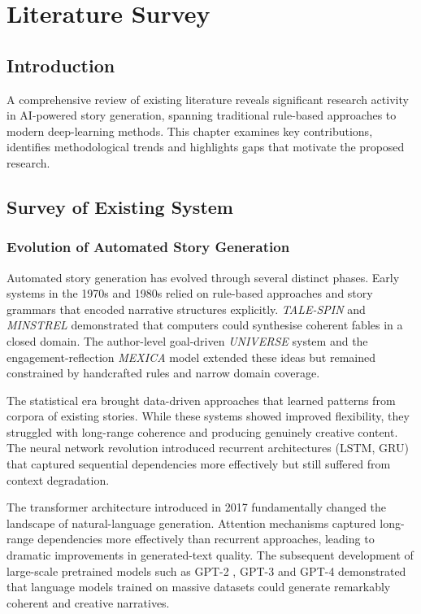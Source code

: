 \chapter{Literature Survey}
\label{ch:litreview}

\section{Introduction}
A comprehensive review of existing literature reveals significant
research activity in AI-powered story generation, spanning traditional
rule-based approaches to modern deep-learning methods. This chapter
examines key contributions, identifies methodological trends and
highlights gaps that motivate the proposed research.

\section{Survey of Existing System}

\subsection{Evolution of Automated Story Generation}
Automated story generation has evolved through several distinct
phases. Early systems in the 1970s and 1980s relied on rule-based
approaches and story grammars that encoded narrative structures
explicitly. \emph{TALE-SPIN} \cite{meehan1977talespin} and
\emph{MINSTREL} demonstrated that computers could synthesise coherent
fables in a closed domain. The author-level goal-driven \emph{UNIVERSE}
system \cite{lebowitz1985universe} and the engagement-reflection
\emph{MEXICA} model \cite{perezperez2001mexica} extended these ideas
but remained constrained by handcrafted rules and narrow domain
coverage.

The statistical era brought data-driven approaches that learned
patterns from corpora of existing stories. While these systems showed
improved flexibility, they struggled with long-range coherence and
producing genuinely creative content. The neural network revolution
introduced recurrent architectures (LSTM, GRU) that captured
sequential dependencies more effectively but still suffered from
context degradation.

The transformer architecture introduced in 2017
\cite{vaswani2017attention} fundamentally changed the landscape of
natural-language generation. Attention mechanisms captured long-range
dependencies more effectively than recurrent approaches, leading to
dramatic improvements in generated-text quality. The subsequent
development of large-scale pretrained models such as
GPT-2 \cite{radford2019gpt2}, GPT-3 \cite{brown2020gpt3} and
GPT-4 \cite{openai2023gpt4} demonstrated that language models trained
on massive datasets could generate remarkably coherent and creative
narratives.

